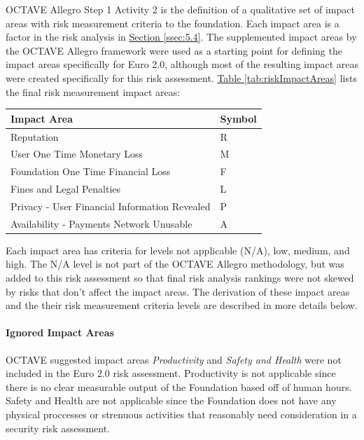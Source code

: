 \documentclass[12pt]{article} %
\newcommand{\hypertableref}[1]{\hyperref[#1]{Table \ref{#1}}}
\newcommand{\hypersectionref}[1]{\hyperref[#1]{Section \ref{#1}}}
\begin{document}
{OCTAVE Allegro Step 1 Activity 2 is the definition of a qualitative set of impact areas with risk measurement criteria to the foundation. Each impact area is a factor in the risk analysis in \hypersectionref{ssec:5.4}. The supplemented impact areas by the OCTAVE Allegro framework were used as a starting point for defining the impact areas specifically for Euro 2.0, although most of the resulting impact areas were created specifically for this risk assessment. \hypertableref{tab:riskImpactAreas} lists the final risk measurement impact areas:

\begin{center}
\begin{tabular}{ | l | l |}
  \hline
  \textbf{Impact Area} & \textbf{Symbol}
  \\ \hline
  Reputation & R
  \\ \hline
  User One Time Monetary Loss & M
  \\ \hline
  Foundation One Time Financial Loss & F
  \\ \hline
  Fines and Legal Penalties & L
  \\ \hline
  Privacy - User Financial Information Revealed & P
  \\ \hline
  Availability - Payments Network Unusable & A
  \\ \hline
\end{tabular}
\end{center}
\label{tab:riskImpactAreas}

Each impact area has criteria for levels not applicable (N/A), low, medium, and high. The N/A level is not part of the OCTAVE Allegro methodology, but was added to this risk assessment so that final risk analysis rankings were not skewed by risks that don't affect the impact areas. The derivation of these impact areas and the their risk measurement criteria levels are described in more details below.

\paragraph{Ignored Impact Areas}

OCTAVE suggested impact areas \textit{Productivity} and \textit{Safety and Health} were not included in the Euro 2.0 risk assessment. Productivity is not applicable since there is no clear measurable output of the Foundation based off of human hours. Safety and Health are not applicable since the Foundation does not have any physical proccesses or strenuous activities that reasonably need consideration in a security risk assessment.

}
\end{document}
